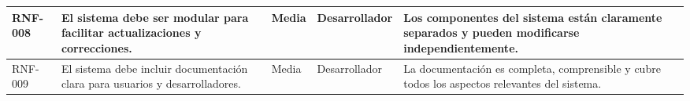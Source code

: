 \begin{table}[H]
\begin{adjustbox}{width=\textwidth}
\begin{tabular}{p{1.2cm}p{5cm}p{1.75cm}p{2.25cm}p{5cm}}
    \hline
    RNF-008 & El sistema debe ser modular para facilitar actualizaciones y correcciones. & Media & Desarrollador & Los componentes del sistema están claramente separados y pueden modificarse independientemente. \\
    \hline
    RNF-009 & El sistema debe incluir documentación clara para usuarios y desarrolladores. & Media & Desarrollador & La documentación es completa, comprensible y cubre todos los aspectos relevantes del sistema. \\
    \hline
    \end{tabular}
    \end{adjustbox}
    \end{table}